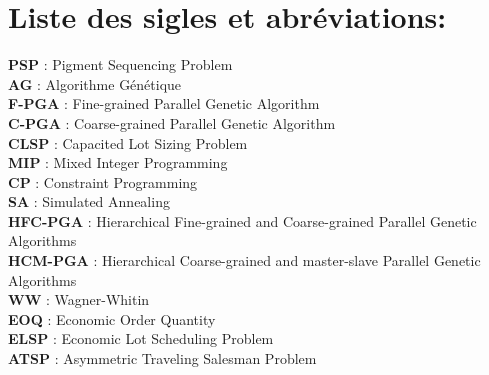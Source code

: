 \documentclass[12pt,a4paper]{article}
\begin{document}
	\newpage
	\tableofcontents
	
	\newpage
	
	\listoffigures
	
	\newpage
	
	\listoftables
	
	\newpage
	
	\listofalgorithms
	
	\newpage
	\section*{Liste des sigles et abréviations:}
	
	\vspace{1cm}
	
	\textbf{PSP} : Pigment Sequencing Problem \\
	\hspace*{.5cm} \textbf{AG} : Algorithme Génétique \\
	\hspace*{.5cm} \textbf{F-PGA} : Fine-grained Parallel Genetic Algorithm \\
	\hspace*{.5cm} \textbf{C-PGA} : Coarse-grained Parallel Genetic Algorithm \\
	\hspace*{.5cm} \textbf{CLSP} : Capacited Lot Sizing Problem \\
	\hspace*{.5cm} \textbf{MIP} : Mixed Integer Programming \\
	\hspace*{.5cm} \textbf{CP} : Constraint Programming \\
	\hspace*{.5cm} \textbf{SA} : Simulated Annealing\\
	\hspace*{.5cm} \textbf{HFC-PGA} : Hierarchical Fine-grained and Coarse-grained Parallel Genetic Algorithms \\
\hspace*{.5cm} \textbf{HCM-PGA} : Hierarchical Coarse-grained and master-slave Parallel Genetic Algorithms \\
	\hspace*{.5cm} \textbf{WW} : Wagner-Whitin \\
	\hspace*{.5cm} \textbf{EOQ} : Economic Order Quantity \\
	\hspace*{.5cm} \textbf{ELSP} : Economic Lot Scheduling Problem \\
	\hspace*{.5cm} \textbf{ATSP} : Asymmetric Traveling Salesman Problem
	
\end{document}
